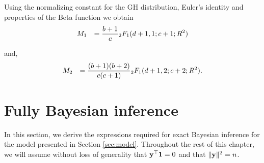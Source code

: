Using the normalizing constant for the GH distribution,
Euler's identity and properties of the Beta function we obtain
\begin{equation}\label{eq:M1}
\begin{array}{rl}
\displaystyle M_1 
& \displaystyle  =    
\frac{b + 1}{c}
{}_2 F_1 (d + 1, 1; c + 1; R^2)    
\end{array} 
\end{equation}


\noindent 
and,
\begin{equation}\label{eq:M2}
\begin{array}{rl}
\displaystyle M_2
& \displaystyle =
\frac{(b+1)(b+2)}{c(c+1)}    {}_2 F_1(d+1, 2; c+ 2; R^2).    
\end{array} 
\end{equation}

\section{Fully Bayesian inference}

In this section, we derive the expressions required for exact Bayesian inference for the model presented in
Section \ref{sec:model}. Throughout the rest of this chapter, we will assume without loss of
generality that ${\bf y}^\top{\bf1} = 0$ and that $\|{\bf y}\|^2 = n$.

